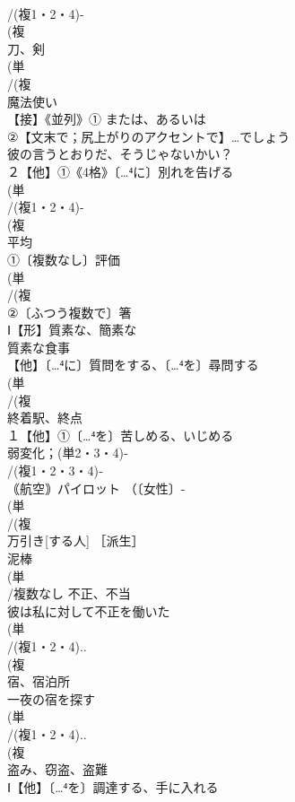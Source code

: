 \documentclass[8pt]{extreport}
\begin{document}
\begin{CJK}{UTF8}{min}
\\	/(複1・2・4)-
\\	(複
\\	刀、剣 
\\	(単
\\	/(複
\\	魔法使い 
\\	【接】《並列》① または、あるいは 
\\	②【文末で；尻上がりのアクセントで】…でしょう 
\\	彼の言うとおりだ、そうじゃないかい？
\\	２【他】①《4格》〔…⁴に〕別れを告げる
\\	(単
\\	/(複1・2・4)-
\\	(複
\\	平均 
\\	①〔複数なし〕評価 
\\	(単
\\	/(複
\\	②〔ふつう複数で〕箸 
\\	Ⅰ【形】質素な、簡素な 
\\	質素な食事
\\	【他】〔…⁴に〕質問をする、〔…⁴を〕尋問する 
\\	(単
\\	/(複
\\	終着駅、終点 
\\	１【他】①〔…⁴を〕苦しめる、いじめる 
\\	弱変化；(単2・3・4)‐
\\	/(複1・2・3・4)‐
\\	｟航空｠パイロット （〔女性〕-
\\	(単
\\	/(複
\\	万引き[する人] ［派生］ 
\\	泥棒
\\	(単
\\	/複数なし 不正、不当 
\\	彼は私に対して不正を働いた
\\	(単
\\	/(複1・2・4)..
\\	(複
\\	宿、宿泊所 
\\	一夜の宿を探す
\\	(単
\\	/(複1・2・4)..
\\	(複
\\	盗み、窃盗、盗難
\\	Ⅰ【他】〔…⁴を〕調達する、手に入れる 

\end{CJK}
\end{document}
